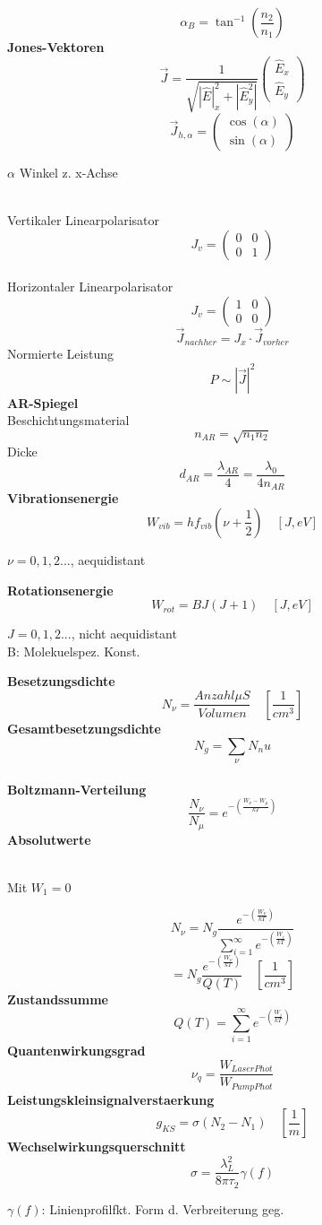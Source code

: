 \documentclass[12pt,a4paper,oneside]{article}
\begin{document}
\begin{multicols}{3}
\begin{tiny}
	\end{tiny}$$\alpha_B = \tan^{-1}(\frac{n_2}{n_1})$$
\textbf{Jones-Vektoren}
$$\vec{J}=\frac{1}{\sqrt{|\hat{E}|^2_x+|\hat{E}^2_y|}} \begin{pmatrix}
\hat{E}_x \\ \hat{E}_y
\end{pmatrix}$$
$$\vec{J}_{h, \alpha}  = \begin{pmatrix}
\cos(\alpha) \\ \sin(\alpha)
\end{pmatrix} $$ 
\begin{tiny} $\alpha$ Winkel z. x-Achse
\end{tiny}
\\Vertikaler Linearpolarisator $$ J_v = \begin{pmatrix}
0  & 0 \\ 0 & 1
\end{pmatrix}$$
\\Horizontaler Linearpolarisator $$ J_v = \begin{pmatrix}
1  & 0 \\ 0 & 0
\end{pmatrix}$$
$$\vec{J}_{nachher}= J_x \cdot \vec{J}_{vorher}$$
Normierte Leistung $$ P \sim |\vec{J}|^2$$
\textbf{AR-Spiegel}\\
Beschichtungsmaterial
$$n_{AR}= \sqrt{n_1 n_2} $$
Dicke $$d_{AR}= \frac{\lambda_{AR}}{4}= \frac{\lambda_0}{4 n_{AR}}$$
\textbf{Vibrationsenergie} $$W_{vib}=h f_{vib} (\nu + \frac{1}{2}) \quad [J, eV]$$\begin{tiny}$\nu = 0, 1, 2... $, aequidistant\\
\end{tiny} 
\textbf{Rotationsenergie} $$W_{rot}= B J (J+1)\quad [J, eV]$$ \begin{tiny}$J=0,1,2...$, nicht aequidistant \\B: Molekuelspez. Konst.\\
\end{tiny}
\textbf{Besetzungsdichte} $$N_\nu = \frac{Anzahl \mu S}{Volumen} \quad [\frac{1}{cm^3}]$$
\textbf{Gesamtbesetzungsdichte} $$N_g = \sum_\nu N_nu$$\\
\textbf{Boltzmann-Verteilung }$$\frac{N_\nu}{N_\mu}=e^{-(\frac{W_\nu-W_\mu}{kT})}$$
\textbf{Absolutwerte} \begin{tiny}\\Mit $W_1 = 0$
\end{tiny}$$N_\nu = N_g \frac{e^{-(\frac{W_\nu}{kT})}}{ \sum_{i=1}^{\infty} e^{-(\frac{W_i}{kT})}}$$ $$ =N_g \frac{e^{-(\frac{W_\nu}{kT})}}{ Q(T)} \quad [\frac{1}{cm^3}]$$
\textbf{Zustandssumme} $$Q(T) = \sum_{i=1}^{\infty} e^{-(\frac{W_i}{kT})} $$
\textbf{Quantenwirkungsgrad} $$\nu_q = \frac{W_{LaserPhot}}{W_{PumpPhot}}$$
\textbf{Leistungskleinsignalverstaerkung} $$g_{KS}=\sigma(N_2-N_1)\quad[\frac{1}{m}]$$
\textbf{Wechselwirkungsquerschnitt} $$\sigma= \frac{\lambda_L^2}{8 \pi \tau_2}\gamma(f)$$\begin{tiny}$\gamma(f)$: Linienprofilfkt. Form d. Verbreiterung geg.\\
\end{tiny}



\end{multicols}
\end{document}
